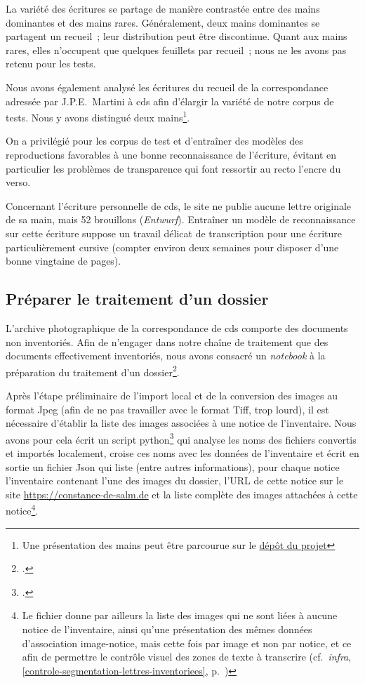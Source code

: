 \documentclass[a4paper,12pt,twoside]{book}
\begin{document}
				La variété des écritures se partage de manière contrastée entre des mains dominantes et des mains rares. Généralement, deux mains dominantes se partagent un recueil~; leur distribution peut être discontinue. Quant aux mains rares, elles n'occupent que quelques feuillets par recueil~; nous ne les avons pas retenu pour les tests.
				
				Nous avons également analysé les écritures du recueil de la correspondance adressée par J.P.E.~Martini à \gls{cds} afin d'élargir la variété de notre corpus de tests. Nous y avons distingué deux mains\footnote{Une présentation des mains peut être parcourue sur le \href{https://github.com/sbiay/CdS-edition/tree/main/htr/sources}{dépôt du projet}}.
				
				On a privilégié pour les corpus de test et d'entraîner des modèles des reproductions favorables à une bonne reconnaissance de l'écriture, évitant en particulier les problèmes de transparence qui font ressortir au recto l'encre du verso.
				
				Concernant l'écriture personnelle de \gls{cds}, le site ne publie aucune lettre originale de sa main, mais 52 brouillons (\textit{Entwurf}). Entraîner un modèle de reconnaissance sur cette écriture suppose un travail délicat de transcription pour une écriture particulièrement cursive (compter environ deux semaines pour disposer d'une bonne vingtaine de pages).
		
			\subsection{Préparer le traitement d'un dossier}
				L'archive photographique de la correspondance de \gls{cds} comporte des documents non inventoriés. Afin de n'engager dans notre chaîne de traitement que des documents effectivement inventoriés, nous avons consacré un \textit{notebook} à la préparation du traitement d'un dossier\footcite{biayPreparerTraitementDossier2022}.
				
				Après l'étape préliminaire de l'import local et de la conversion des images au format Jpeg (afin de ne pas travailler avec le format Tiff, trop lourd), il est nécessaire d'établir la liste des images associées à une notice de l'inventaire. Nous avons pour cela écrit un script python\footcite{biayDonneesImagesPy2022} qui analyse les noms des fichiers convertis et importés localement, croise ces noms avec les données de l'inventaire et écrit en sortie un fichier Json qui liste (entre autres informations), pour chaque notice l'inventaire contenant l'une des images du dossier, l'URL de cette notice sur le site \url{https://constance-de-salm.de} et la liste complète des images attachées à cette notice\footnote{Le fichier donne par ailleurs la liste des images qui ne sont liées à aucune notice de l'inventaire, ainsi qu'une présentation des mêmes données d'association image-notice, mais cette fois par image et non par notice, et ce afin de permettre le contrôle visuel des zones de texte à transcrire (cf.~\textit{infra}, \ref{controle-segmentation-lettres-inventoriees}, p.~\pageref{controle-segmentation-lettres-inventoriees})}.
				
\end{document}
